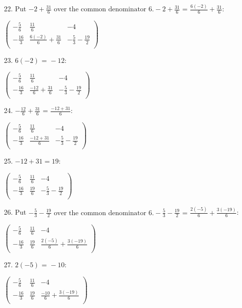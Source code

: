 \documentclass{article}
\begin{document}
22. Put $-2+\frac{31}{6}\text{ over the common denominator }6. -2+\frac{31}{6}\text{ = }\frac{6 (-2)}{6}+\frac{31}{6}$:

$\left(
\begin{array}{ccc}
-\frac{5}{6} & \frac{11}{6} & -4 \\
 -\frac{16}{3} & \frac{6 (-2)}{6}+\frac{31}{6} & -\frac{5}{3}-\frac{19}{2} \\
\end{array}
\right)$

23. $6 (-2)\text{ = }-12:$

$\left(
\begin{array}{ccc}
-\frac{5}{6} & \frac{11}{6} & -4 \\
 -\frac{16}{3} & \frac{-12}{6}+\frac{31}{6} & -\frac{5}{3}-\frac{19}{2} \\
\end{array}
\right)$

24. $-\frac{12}{6}+\frac{31}{6}\text{ = }\frac{-12+31}{6}$:

$\left(
\begin{array}{ccc}
-\frac{5}{6} & \frac{11}{6} & -4 \\
 -\frac{16}{3} & \frac{-12+31}{6} & -\frac{5}{3}-\frac{19}{2} \\
\end{array}
\right)$

25. $-12+31=19:$

$\left(
\begin{array}{ccc}
-\frac{5}{6} & \frac{11}{6} & -4 \\
 -\frac{16}{3} & \frac{19}{6} & -\frac{5}{3}-\frac{19}{2} \\
\end{array}
\right)$

26. Put $-\frac{5}{3}-\frac{19}{2}\text{ over the common denominator }6. -\frac{5}{3}-\frac{19}{2}\text{ = }\frac{2 (-5)}{6}+\frac{3 (-19)}{6}$:

$\left(
\begin{array}{ccc}
-\frac{5}{6} & \frac{11}{6} & -4 \\
 -\frac{16}{3} & \frac{19}{6} & \frac{2 (-5)}{6}+\frac{3 (-19)}{6} \\
\end{array}
\right)$

27. $2 (-5)\text{ = }-10:$

$\left(
\begin{array}{ccc}
-\frac{5}{6} & \frac{11}{6} & -4 \\
 -\frac{16}{3} & \frac{19}{6} & \frac{-10}{6}+\frac{3 (-19)}{6} \\
\end{array}
\right)$
\end{document}
